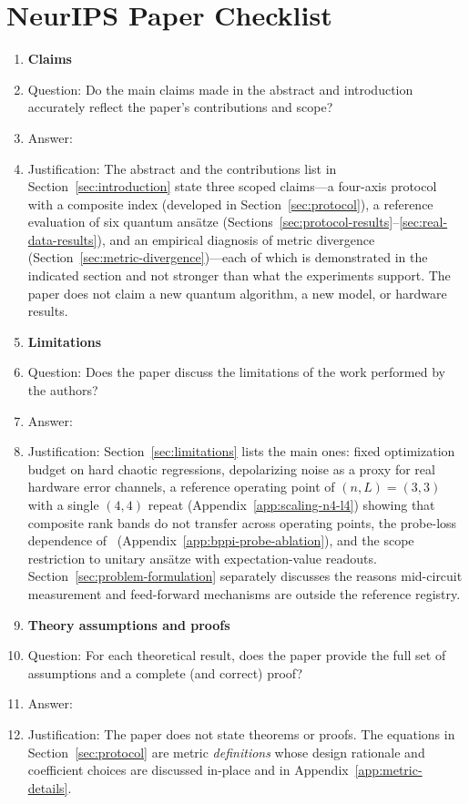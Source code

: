 \section*{NeurIPS Paper Checklist}

\begin{enumerate}

\item {\bf Claims}
    \item[] Question: Do the main claims made in the abstract and introduction accurately reflect the paper's contributions and scope?
    \item[] Answer: \answerYes{}
    \item[] Justification: The abstract and the contributions list in Section~\ref{sec:introduction} state three scoped claims---a four-axis protocol with a composite index (developed in Section~\ref{sec:protocol}), a reference evaluation of six quantum ans\"atze (Sections~\ref{sec:protocol-results}--\ref{sec:real-data-results}), and an empirical diagnosis of metric divergence (Section~\ref{sec:metric-divergence})---each of which is demonstrated in the indicated section and not stronger than what the experiments support. The paper does not claim a new quantum algorithm, a new model, or hardware results.

\item {\bf Limitations}
    \item[] Question: Does the paper discuss the limitations of the work performed by the authors?
    \item[] Answer: \answerYes{}
    \item[] Justification: Section~\ref{sec:limitations} lists the main ones: fixed optimization budget on hard chaotic regressions, depolarizing noise as a proxy for real hardware error channels, a reference operating point of $(n,L) = (3,3)$ with a single $(4,4)$ repeat (Appendix~\ref{app:scaling-n4-l4}) showing that composite rank bands do not transfer across operating points, the probe-loss dependence of \bppi\ (Appendix~\ref{app:bppi-probe-ablation}), and the scope restriction to unitary ans\"atze with expectation-value readouts. Section~\ref{sec:problem-formulation} separately discusses the reasons mid-circuit measurement and feed-forward mechanisms are outside the reference registry.

\item {\bf Theory assumptions and proofs}
    \item[] Question: For each theoretical result, does the paper provide the full set of assumptions and a complete (and correct) proof?
    \item[] Answer: \answerNA{}
    \item[] Justification: The paper does not state theorems or proofs. The equations in Section~\ref{sec:protocol} are metric \emph{definitions} whose design rationale and coefficient choices are discussed in-place and in Appendix~\ref{app:metric-details}.


\end{enumerate}
